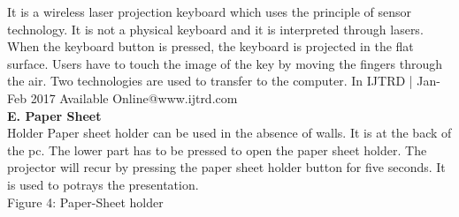 \documentclass{article}
\begin{document}
   It is a wireless laser projection keyboard which uses the principle of sensor technology. It is not a physical keyboard and it is interpreted through lasers. When the keyboard button is pressed, the keyboard is projected in the flat surface. Users have to touch the image of the key by moving the fingers through the air. Two technologies are used to transfer to the computer. In
   IJTRD | Jan-Feb 2017 Available Online@www.ijtrd.com \\ 
   \textbf{E. Paper Sheet}\\
    Holder Paper sheet holder can be used in the absence of walls. It is at the back of the pc. The lower part has to be pressed to open the paper sheet holder. The projector will recur by pressing the paper sheet holder button for five seconds. It is used to potrays the presentation.\\
    Figure 4: Paper-Sheet holder \\
    \newpage 
\end{document}
